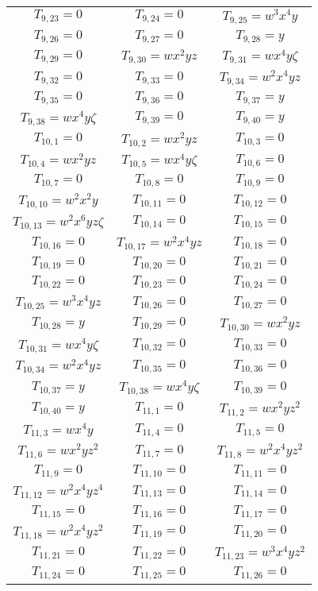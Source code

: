 \documentclass[12pt]{memoireuqam1.3}
\begin{document}
\begin{longtable}{|c|c|c|}
$T_{9,23}= 0$&
$T_{9,24}= 0$&
$T_{9,25}= w^3x^4y$\\
$T_{9,26}= 0$&
$T_{9,27}= 0$&
$T_{9,28}= y$\\
$T_{9,29}= 0$&
$T_{9,30}= wx^2yz$&
$T_{9,31}= wx^4y\zeta$\\
$T_{9,32}= 0$&
$T_{9,33}= 0$&
$T_{9,34}= w^2x^4yz$\\
$T_{9,35}= 0$&
$T_{9,36}= 0$&
$T_{9,37}= y$\\
$T_{9,38}= wx^4y\zeta$&
$T_{9,39}= 0$&
$T_{9,40}= y$\\
$T_{10,1}= 0$&
$T_{10,2}= wx^2yz$&
$T_{10,3}= 0$\\
$T_{10,4}= wx^2yz$&
$T_{10,5}= wx^4y\zeta$&
$T_{10,6}= 0$\\
$T_{10,7}= 0$&
$T_{10,8}= 0$&
$T_{10,9}= 0$\\
$T_{10,10}= w^2x^2y$&
$T_{10,11}= 0$&
$T_{10,12}= 0$\\
$T_{10,13}= w^2x^6yz\zeta$&
$T_{10,14}= 0$&
$T_{10,15}= 0$\\
$T_{10,16}= 0$&
$T_{10,17}= w^2x^4yz$&
$T_{10,18}= 0$\\
$T_{10,19}= 0$&
$T_{10,20}= 0$&
$T_{10,21}= 0$\\
$T_{10,22}= 0$&
$T_{10,23}= 0$&
$T_{10,24}= 0$\\
$T_{10,25}= w^3x^4yz$&
$T_{10,26}= 0$&
$T_{10,27}= 0$\\
$T_{10,28}= y$&
$T_{10,29}= 0$&
$T_{10,30}= wx^2yz$\\
$T_{10,31}= wx^4y\zeta$&
$T_{10,32}= 0$&
$T_{10,33}= 0$\\
$T_{10,34}= w^2x^4yz$&
$T_{10,35}= 0$&
$T_{10,36}= 0$\\
$T_{10,37}= y$&
$T_{10,38}= wx^4y\zeta$&
$T_{10,39}= 0$\\
$T_{10,40}= y$&
$T_{11,1}= 0$&
$T_{11,2}= wx^2yz^2$\\
$T_{11,3}= wx^4y$&
$T_{11,4}= 0$&
$T_{11,5}= 0$\\
$T_{11,6}= wx^2yz^2$&
$T_{11,7}= 0$&
$T_{11,8}= w^2x^4yz^2$\\
$T_{11,9}= 0$&
$T_{11,10}= 0$&
$T_{11,11}= 0$\\
$T_{11,12}= w^2x^4yz^4$&
$T_{11,13}= 0$&
$T_{11,14}= 0$\\
$T_{11,15}= 0$&
$T_{11,16}= 0$&
$T_{11,17}= 0$\\
$T_{11,18}= w^2x^4yz^2$&
$T_{11,19}= 0$&
$T_{11,20}= 0$\\
$T_{11,21}= 0$&
$T_{11,22}= 0$&
$T_{11,23}= w^3x^4yz^2$\\
$T_{11,24}= 0$&
$T_{11,25}= 0$&
$T_{11,26}= 0$\\

\end{longtable}
\end{document}
